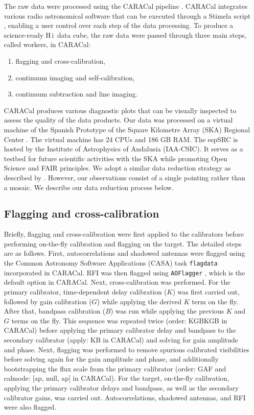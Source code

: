 \documentclass{aa}
\newcommand{\HI}{H\,{\sc i}}
\begin{document}
The raw data were processed using the CARACal pipeline \citep{2020ASPC..527..635J}. CARACal integrates various radio astronomical software that can be executed through a 
Stimela script \citep{2018PhDT.......215M}, enabling a user control over each step of the data processing. To produce a science-ready \HI\ data cube, the raw data 
were passed through three main steps, called workers, in CARACal: 
\begin{enumerate}
    \item flagging and cross-calibration,
    \item continuum imaging and self-calibration,
    \item continuum subtraction and line imaging.
\end{enumerate}
CARACal produces various diagnostic plots that can be visually inspected to assess the quality of the data products. Our data was processed on 
a virtual machine of the Spanish Prototype of the Square Kilometre Array (SKA) Regional Center \citep[espSRC,][]{2022JATIS...8a1004G}. 
The virtual machine has 24 CPUs and 186 GB RAM. The espSRC is hosted by the Institute of Astrophysics of Andalusia (IAA-CSIC). 
It serves as a testbed for future scientific activities with the SKA while promoting Open Science and FAIR  principles. We adopt a similar data reduction strategy as described by \citet{2023A&A...673A.146S}. However, our observations consist of a single pointing rather than a mosaic. We describe our data reduction process below. 
\subsection{Flagging and cross-calibration}
Briefly, flagging and cross-calibration were first applied to the calibrators before performing on-the-fly calibration and flagging on the target. 
The detailed steps are as follows. First, autocorrelations and shadowed antennas were flagged using the Common Astronomy Software Applications (CASA) task 
\texttt{flagdata} incorporated in CARACal. 
RFI was then flagged using \texttt{AOFlagger} \citep{2012A&A...539A..95O}, which is the default option in CARACal. Next, cross-calibration was performed. 
For the primary calibrator, time-dependent delay calibration ($K$) was first carried out, followed by gain calibration ($G$) while applying the derived $K$ term on the fly. 
After that, bandpass calibration ($B$) was run while applying the previous $K$ and $G$ terms on the fly. This sequence was repeated twice (order: KGBKGB in CARACal) before 
applying the primary calibrator delay and bandpass to the secondary calibrator (apply: KB in CARACal) and solving for gain amplitude and phase. Next, flagging was performed 
to remove spurious calibrated visibilities before solving again for the gain amplitude and phase, and additionally bootstrapping the flux scale from the primary 
calibrator (order: GAF and calmode: [ap, null, ap] in CARACal). For the target, on-the-fly calibration, applying the primary calibrator delays and bandpass, 
as well as the secondary calibrator gains, was carried out. Autocorrelations, shadowed antennas, and RFI were also flagged.                    
\end{document}
